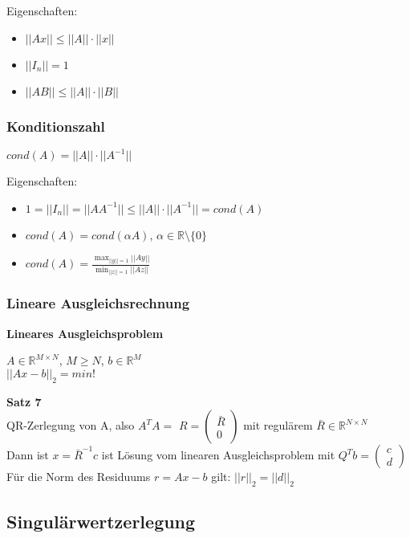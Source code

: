 \documentclass[a4paper]{article}
\begin{document}
Eigenschaften:
\begin{itemize}
    \item $||Ax|| \le ||A||\cdot||x||$
    \item $||I_n|| = 1$
    \item $||AB|| \le ||A||\cdot||B||$
\end{itemize}

\subsubsection{Konditionszahl}

$cond(A) = ||A|| \cdot ||A^{-1}||$

\vspace{1em}
Eigenschaften:
\begin{itemize}
    \item $1 = ||I_n|| = ||AA^{-1}|| \le ||A|| \cdot ||A^{-1}|| = cond(A)$
    \item $cond(A) = cond(\alpha A)$, $\alpha \in \mathbb{R} \setminus \{0\}$
    \item $cond(A) = \frac{\max_{||y|| = 1} ||Ay||}{\min_{||z|| = 1} ||Az||}$
\end{itemize}

\subsubsection{Lineare Ausgleichsrechnung}

\textbf{Lineares Ausgleichsproblem}

$A \in \mathbb{R}^{M \times N}$,
$M \ge N$,
$b \in \mathbb{R}^M$
\\
$||Ax-b||_2 = min!$

\vspace{2em}
\textbf{Satz 7}
\\
QR-Zerlegung von A, also $A^T A = $
$R = \begin{pmatrix}\bar{R}\\0\end{pmatrix}$
mit regulärem $\bar{R} \in \mathbb{R}^{N \times N}$
\\
Dann ist $x = \bar{R}^{-1} c$ ist Lösung vom linearen Ausgleichsproblem mit
$Q^T b = \begin{pmatrix}c\\d\end{pmatrix}$
\\
Für die Norm des Residuums $r = Ax - b$ gilt: $||r||_2 = ||d||_2$ 

\subsection{Singulärwertzerlegung}
\end{document}
